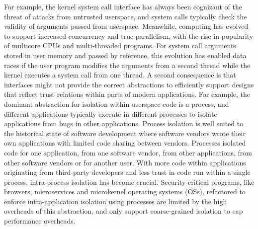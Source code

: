 For example, the kernel system call interface has always been cognizant of
the threat
of attacks from untrusted userspace, and system calls typically check the 
validity of arguments passed from userspace.
Meanwhile, computing has evolved to support increased concurrency and true 
parallelism, with the rise in popularity of multicore CPUs and multi-threaded 
programs.
For system call arguments stored in user memory and passed by reference,
this evolution has enabled data races if the user program
modifies the arguments from a second thread while the kernel executes
a system call from one thread.
A second consequence is that interfaces might not provide the correct
abstractions to efficiently support designs that reflect
trust relations within parts of modern applications.
For example, the dominant abstraction for isolation within userspace code
is a process, and different applications typically execute in different 
processes to isolate applications from bugs in other applications.
Process isolation is well suited to the historical state of software
development where software vendors wrote their own applications with limited
code sharing between vendors.
Processes isolated code for one application, from one software vendor,
from other applications, from other software vendors or for another user.
With more code within applications originating from third-party developers
and less trust in code run within a single process, intra-process isolation
has become crucial.
Security-critical programs, like browsers, microservices and microkernel
operating systems (OSs), refactored to enforce intra-application isolation 
using processes are limited by the high overheads of this abstraction, and 
only support coarse-grained isolation to cap performance overheads.


